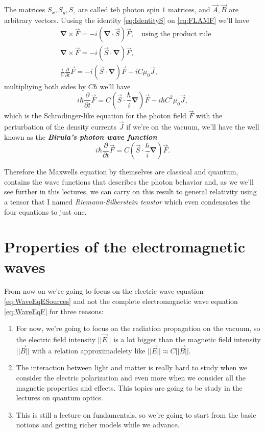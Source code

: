     The matrices $S_x,S_y,S_z$ are called teh photon spin $1$ matrices, and $\vec{A},\vec{B}$ are arbitrary vectors. Uusing the identity \ref{eq:IdentityS} on \ref{eq:FLAMF} we'll have
    \begin{align*}
        & \bm{\nabla}\times \vec{F} = -i\left(\bm{\nabla}\cdot\vec{S}\right)\vec{F}, \quad \text{using the product rule}\\
        & \bm{\nabla}\times \vec{F} = -i\left(\vec{S}\cdot \bm{\nabla}\right)\vec{F},\\
        & \frac{i}{C}\frac{\partial}{\partial t}\vec{F} = -i\left(\vec{S}\cdot \bm{\nabla}\right)\vec{F} -i C\mu_0\vec{J},
    \end{align*}
    multipliying both sides by $C\hbar$ we'll have
    \begin{equation}
        i\hbar \frac{\partial}{\partial t}\vec{F} = C \left(\vec{S}\cdot \frac{\hbar}{i}\bm{\nabla}\right)\vec{F} - i \hbar C^2\mu_0 \vec{J},
    \end{equation}
    which is the Schrödinger-like equation for the photon field $\vec{F}$ with the perturbation of the density currents $\vec{J}$ if we're on the vacuum, we'll have the well known as the \textit{\textbf{Birula's photon wave function}} \cite{bialynicki1994wave}
    \begin{equation}
        i\hbar \frac{\partial}{\partial t}\vec{F} = C \left(\vec{S}\cdot \frac{\hbar}{i}\bm{\nabla}\right)\vec{F}.
    \end{equation}

    Therefore the Maxwells equation by themselves are classical and quantum, contains the wave functions that describes the photon behavior and, as we we'll see further in this lectures, we can carry on this result to general relativity using a tensor that I named \emph{Riemann-Silberstein tenstor} which even condensates the four equations to just one.

\section{Properties of the electromagnetic waves}

    From now on we're going to focus on the electric wave equation \ref{eq:WaveEqESources} and not the complete electromagnetic wave equation \ref{eq:WaveEqF} for three reasons:
    \begin{enumerate}
        \item For now, we're going to focus on the radiation propagation on the vacuum, so the electric field intensity $||\vec{E}||$ is a lot bigger than the magnetic field intensity $||\vec{B}||$ with a relation approximadelety like $||\vec{E}|| \approx C ||\vec{B}||$.
        \item The interaction between light and matter is really hard to study when we consider the electric polarization and even more when we consider all the magnetic properties and effects. This topics are going to be study in the lectures on quantum optics.
        \item This is still a lecture on fundamentals, so we're going to start from the basic notions and getting richer models while we advance.
    \end{enumerate}

